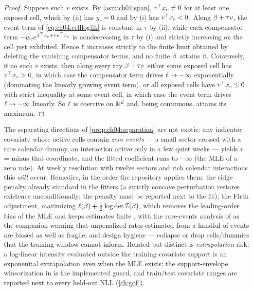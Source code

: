 \begin{proof}
Suppose such $v$ exists. By \cref{asm:ch04:span}, $v^{\top}x_c \ne 0$ for
at least one exposed cell, which by (ii) has $y_c = 0$ and by (i) has
$v^{\top}x_c < 0$. Along $\beta + \tau v$, the event term of
\cref{eq:ch04:cellloglik} is constant in $\tau$ by (ii), while each
compensator term $-w_c e^{\beta^{\top}x_c + \tau v^{\top}x_c}$ is
nondecreasing in $\tau$ by (i) and strictly increasing on the cell just
exhibited. Hence $\ell$ increases strictly to the finite limit obtained
by deleting the vanishing compensator terms, and no finite $\beta$
attains it. Conversely, if no such $v$ exists, then along every ray
$\beta + \tau v$ either some exposed cell has $v^{\top}x_c > 0$, in which
case the compensator term drives $\ell \to -\infty$ exponentially
(dominating the linearly growing event term), or all exposed cells have
$v^{\top}x_c \le 0$ with strict inequality at some event cell, in which
case the event term drives $\ell \to -\infty$ linearly. So $\ell$ is
coercive on $\mathbb{R}^d$ and, being continuous, attains its maximum.
\end{proof}

\begin{warning}\label{warn:ch04:separation}
The separating directions of \cref{prop:ch04:separation} are not exotic:
any indicator covariate whose active cells contain \emph{zero events} ---
a small sector crossed with a rare calendar dummy, an interaction active
only in a few quiet weeks --- yields $v$ = minus that coordinate, and the
fitted coefficient runs to $-\infty$ (the MLE of a zero rate). At weekly
resolution with twelve sectors and rich calendar interactions this
\emph{will} occur. Remedies, in the order the repository applies them: the
ridge penalty already standard in the fitters (a strictly concave
perturbation restores existence unconditionally; the penalty must be
reported next to the fit); the Firth adjustment, maximizing $\ell(\beta)
+ \tfrac{1}{2}\log\det\mathcal{I}(\beta)$, which removes the leading-order
bias of the MLE and keeps estimates finite \citep{firth1993}, with the
rare-events analysis of \citet{kingzeng2001} as the companion warning
that unpenalized rates estimated from a handful of events are biased as
well as fragile; and design hygiene --- collapse or drop cells/dummies
that the training window cannot inform. Related but distinct is
\emph{extrapolation} risk: a log-linear intensity evaluated outside the
training covariate support is an exponential extrapolation even when the
MLE exists; the support-envelope winsorization in
 is the implemented guard, and train/test
covariate ranges are reported next to every held-out NLL
(\cref{ch:gof}).
\end{warning}

